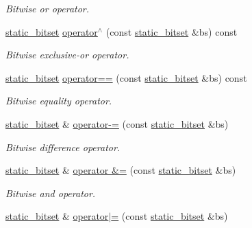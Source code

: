\begin{DoxyCompactItemize}
\begin{DoxyCompactList}\small\item\em Bitwise {\itshape or} operator. \end{DoxyCompactList}\item 
\hyperlink{classlgraph_1_1utils_1_1static__bitset}{static\+\_\+bitset} \hyperlink{classlgraph_1_1utils_1_1static__bitset_a5d4ca0e342e0b0094f20925a62b2068d}{operator$^\wedge$} (const \hyperlink{classlgraph_1_1utils_1_1static__bitset}{static\+\_\+bitset} \&bs) const
\begin{DoxyCompactList}\small\item\em Bitwise {\itshape exclusive-\/or} operator. \end{DoxyCompactList}\item 
\hyperlink{classlgraph_1_1utils_1_1static__bitset}{static\+\_\+bitset} \hyperlink{classlgraph_1_1utils_1_1static__bitset_a901bec6cc27e6b521d33b8658223e1ea}{operator==} (const \hyperlink{classlgraph_1_1utils_1_1static__bitset}{static\+\_\+bitset} \&bs) const
\begin{DoxyCompactList}\small\item\em Bitwise {\itshape equality} operator. \end{DoxyCompactList}\item 
\hyperlink{classlgraph_1_1utils_1_1static__bitset}{static\+\_\+bitset} \& \hyperlink{classlgraph_1_1utils_1_1static__bitset_af4f4a29642e50b6efa406d5f772a0e69}{operator-\/=} (const \hyperlink{classlgraph_1_1utils_1_1static__bitset}{static\+\_\+bitset} \&bs)
\begin{DoxyCompactList}\small\item\em Bitwise {\itshape difference} operator. \end{DoxyCompactList}\item 
\hyperlink{classlgraph_1_1utils_1_1static__bitset}{static\+\_\+bitset} \& \hyperlink{classlgraph_1_1utils_1_1static__bitset_a9be18d0f80ce54324ff6a37e86e125d7}{operator \&=} (const \hyperlink{classlgraph_1_1utils_1_1static__bitset}{static\+\_\+bitset} \&bs)
\begin{DoxyCompactList}\small\item\em Bitwise {\itshape and} operator. \end{DoxyCompactList}\item 
\hyperlink{classlgraph_1_1utils_1_1static__bitset}{static\+\_\+bitset} \& \hyperlink{classlgraph_1_1utils_1_1static__bitset_a62330084392296754cfc5e525d99cab2}{operator$\vert$=} (const \hyperlink{classlgraph_1_1utils_1_1static__bitset}{static\+\_\+bitset} \&bs)

\end{DoxyCompactItemize}
